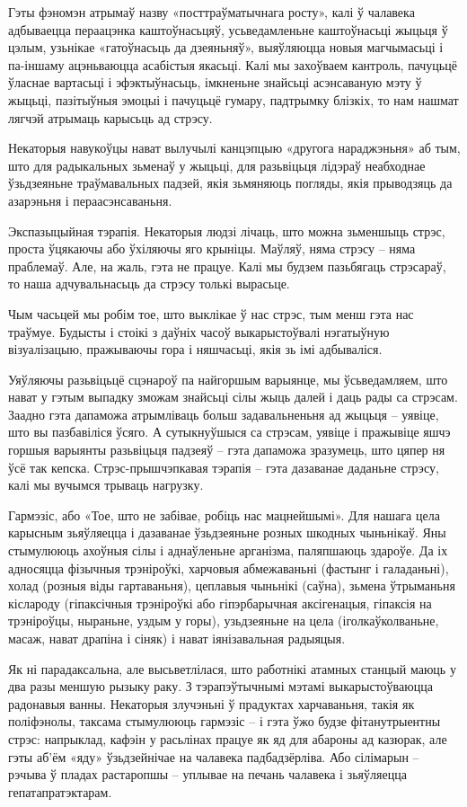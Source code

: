 Гэты фэномэн атрымаў назву «посттраўматычнага росту», калі ў чалавека адбываецца пераацэнка каштоўнасьцяў, усьведамленьне каштоўнасьці жыцьця ў цэлым, узьнікае «гатоўнасьць да дзеяньняў», выяўляюцца новыя магчымасьці і па-іншаму ацэньваюцца асабістыя якасьці. Калі мы захоўваем кантроль, пачуцьцё ўласнае вартасьці і эфэктыўнасьць, імкненьне знайсьці асэнсаваную мэту ў жыцьці, пазітыўныя эмоцыі і пачуцьцё гумару, падтрымку блізкіх, то нам нашмат лягчэй атрымаць карысьць ад стрэсу.

Некаторыя навукоўцы нават вылучылі канцэпцыю «другога нараджэньня» аб тым, што для радыкальных зьменаў у жыцьці, для разьвіцьця лідэраў неабходнае ўзьдзеяньне траўмавальных падзей, якія зьмяняюць погляды, якія прыводзяць да азарэньня і пераасэнсаваньня.

Экспазыцыйная тэрапія. Некаторыя людзі лічаць, што можна зьменшыць стрэс, проста ўцякаючы або ўхіляючы яго крыніцы. Маўляў, няма стрэсу – няма праблемаў. Але, на жаль, гэта не працуе. Калі мы будзем пазьбягаць стрэсараў, то наша адчувальнасьць да стрэсу толькі вырасьце. 

Чым часьцей мы робім тое, што выклікае ў нас стрэс, тым менш гэта нас траўмуе. Будысты і стоікі з даўніх часоў выкарыстоўвалі нэгатыўную візуалізацыю, пражываючы гора і няшчасьці, якія зь імі адбываліся.

Уяўляючы разьвіцьцё сцэнароў па найгоршым варыянце, мы ўсьведамляем, што нават у гэтым выпадку зможам знайсьці сілы жыць далей і даць рады са стрэсам. Заадно гэта дапаможа атрымліваць больш задавальненьня ад жыцьця – уявіце, што вы пазбавіліся ўсяго. А сутыкнуўшыся са стрэсам, уявіце і пражывіце яшчэ горшыя варыянты разьвіцьця падзеяў – гэта дапаможа зразумець, што цяпер ня ўсё так кепска. Стрэс-прышчэпкавая тэрапія – гэта дазаванае даданьне стрэсу, калі мы вучымся трываць нагрузку.

Гармэзіс, або «Тое, што не забівае, робіць нас мацнейшымі». Для нашага цела карысным зьяўляецца і дазаванае ўзьдзеяньне розных шкодных чыньнікаў. Яны стымулююць ахоўныя сілы і аднаўленьне арганізма, паляпшаюць здароўе. Да іх адносяцца фізычныя трэніроўкі, харчовыя абмежаваньні (фастынг і галаданьні), холад (розныя віды гартаваньня), цеплавыя чыньнікі (саўна), зьмена ўтрыманьня кіслароду (гіпаксічныя трэніроўкі або гіпэрбарычная аксігенацыя, гіпаксія на трэніроўцы, ныраньне, уздым у горы), узьдзеяньне на цела (іголкаўколваньне, масаж, нават драпіна і сіняк) і нават іянізавальная радыяцыя.

Як ні парадаксальна, але высьветлілася, што работнікі атамных станцый маюць у два разы меншую рызыку раку. З тэрапэўтычнымі мэтамі выкарыстоўваюцца радонавыя ванны. Некаторыя злучэньні ў прадуктах харчаваньня, такія як поліфэнолы, таксама стымулююць гармэзіс – і гэта ўжо будзе фітанутрыентны стрэс: напрыклад, кафэін у расьлінах працуе як яд для абароны ад казюрак, але гэты аб'ём «яду» ўзьдзейнічае на чалавека падбадзёрліва. Або сілімарын – рэчыва ў пладах растаропшы – уплывае на печань чалавека і зьяўляецца гепатапратэктарам.

